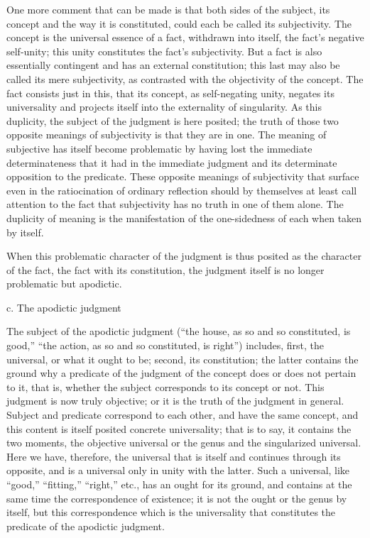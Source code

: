 One more comment that can be made is
that both sides of the subject,
its concept and the way it is constituted,
could each be called its subjectivity.
The concept is the universal essence of a fact,
withdrawn into itself, the fact's negative self-unity;
this unity constitutes the fact's subjectivity.
But a fact is also essentially contingent
and has an external constitution;
this last may also be called its mere subjectivity,
as contrasted with the objectivity of the concept.
The fact consists just in this, that its concept,
as self-negating unity, negates its universality
and projects itself into the externality of singularity.
As this duplicity, the subject of the judgment is here posited;
the truth of those two opposite meanings of subjectivity is
that they are in one.
The meaning of subjective has itself become problematic
by having lost the immediate determinateness
that it had in the immediate judgment
and its determinate opposition to the predicate.
These opposite meanings of subjectivity
that surface even in the ratiocination of ordinary reflection
should by themselves at least call attention to the fact that
subjectivity has no truth in one of them alone.
The duplicity of meaning is the manifestation
of the one-sidedness of each when taken by itself.

When this problematic character of the judgment
is thus posited as the character of the fact,
the fact with its constitution,
the judgment itself is no longer
problematic but apodictic.

c. The apodictic judgment

The subject of the apodictic judgment
(“the house, as so and so constituted, is good,”
“the action, as so and so constituted, is right”)
includes, first, the universal,
or what it ought to be;
second, its constitution;
the latter contains the ground why a predicate of
the judgment of the concept does or does not pertain to it,
that is, whether the subject corresponds to its concept or not.
This judgment is now truly objective;
or it is the truth of the judgment in general.
Subject and predicate correspond to each other,
and have the same concept,
and this content is itself posited concrete universality;
that is to say, it contains the two moments,
the objective universal or the genus
and the singularized universal.
Here we have, therefore, the universal that is itself
and continues through its opposite,
and is a universal only in unity with the latter.
Such a universal, like “good,” “fitting,” “right,” etc.,
has an ought for its ground,
and contains at the same time
the correspondence of existence;
it is not the ought or the genus by itself,
but this correspondence which is the universality
that constitutes the predicate of the apodictic judgment.

